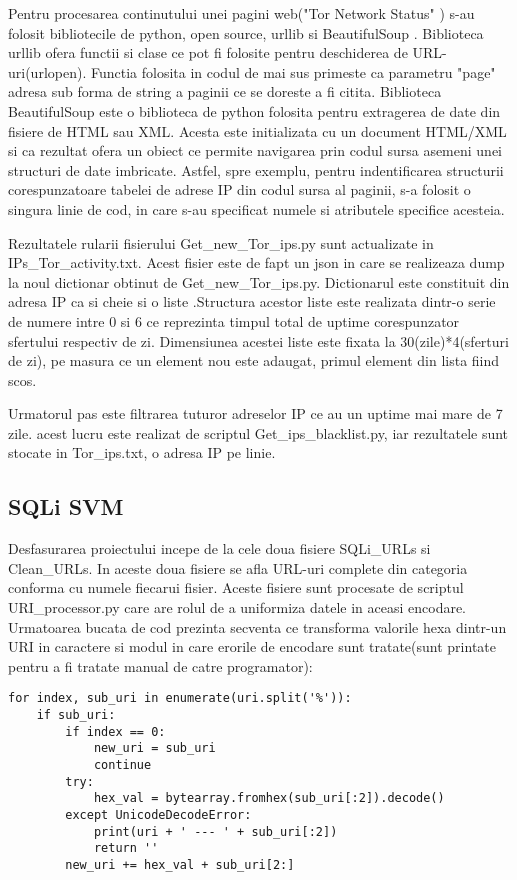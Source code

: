 Pentru procesarea continutului unei pagini web("Tor Network Status" \cite{tot_status}) s-au folosit bibliotecile de python, open source, urllib si BeautifulSoup \cite{btf_soup}. Biblioteca urllib ofera functii si clase ce pot fi folosite pentru deschiderea de URL-uri(urlopen). Functia folosita in codul de mai sus primeste ca parametru "page" adresa sub forma de string a paginii ce se doreste a fi citita. Biblioteca BeautifulSoup este o biblioteca de python folosita pentru extragerea de date din fisiere de HTML sau XML. Acesta este initializata cu un document HTML/XML si ca rezultat ofera un obiect ce permite navigarea prin codul sursa asemeni unei structuri de date imbricate. Astfel, spre exemplu, pentru indentificarea structurii corespunzatoare tabelei de adrese IP din codul sursa al paginii, s-a folosit o singura linie de cod, in care s-au specificat numele si atributele specifice acesteia.

Rezultatele rularii fisierului Get\_new\_Tor\_ips.py sunt actualizate in IPs\_Tor\_activity.txt. Acest fisier este de fapt un json in care se realizeaza dump la noul dictionar obtinut de  Get\_new\_Tor\_ips.py. Dictionarul este constituit din adresa IP ca si cheie si o liste .Structura acestor liste este realizata dintr-o serie de numere intre 0 si 6 ce reprezinta timpul total de uptime corespunzator sfertului respectiv de zi. Dimensiunea acestei liste este fixata la 30(zile)*4(sferturi de zi), pe masura ce un element nou este adaugat, primul element din lista fiind scos.

Urmatorul pas este filtrarea tuturor adreselor IP ce au un uptime mai mare de 7 zile. acest lucru este realizat de scriptul Get\_ips\_blacklist.py, iar rezultatele sunt stocate in Tor\_ips.txt, o adresa IP pe linie.

\subsection{SQLi SVM}
Desfasurarea proiectului incepe de la cele doua fisiere SQLi\_URLs si Clean\_URLs. In aceste doua fisiere se afla URL-uri complete din categoria conforma cu numele fiecarui fisier. Aceste fisiere sunt procesate de scriptul URI\_processor.py care are rolul de a uniformiza datele in aceasi encodare. Urmatoarea bucata de cod prezinta secventa ce transforma valorile hexa dintr-un URI in caractere si modul in care erorile de encodare sunt tratate(sunt printate pentru a fi tratate manual de catre programator):

\lstset{language=python,frame=single, showstringspaces=false}
\begin{lstlisting}
for index, sub_uri in enumerate(uri.split('%')):
    if sub_uri:
        if index == 0:
            new_uri = sub_uri
            continue
        try:
            hex_val = bytearray.fromhex(sub_uri[:2]).decode()
        except UnicodeDecodeError:
            print(uri + ' --- ' + sub_uri[:2])
            return ''
        new_uri += hex_val + sub_uri[2:]
\end{lstlisting}

